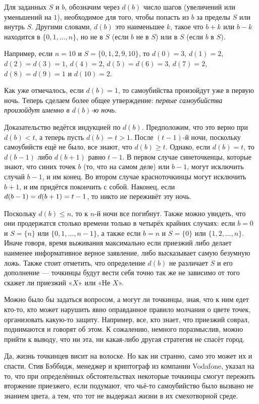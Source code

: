 Для заданных $S$ и $b$, обозначим через $d(b)$ число шагов (увеличений или уменьшений на $1$), необходимое для того, чтобы попасть из $b$ за пределы $S$ или внутрь $S$.
Другими словами, $d(b)$ это наименьшее $k$, такое что $b+k$ или $b-k$ находится в $\{0, 1, \dots, n\}$, но не в $S$ (если $b$ не в  $S$) или в $S$ (если $b$ в $S$).

Например, если $n=10$ и 
$S=\{0,1,2,9,10\}$, то 
$d(0)=3$, 
$d(1)=2$, 
$d(2)=d(3)=1$, 
$d(4)=2$, 
$d(5)=d(6)=3$, 
$d(7)=2$, 
$d(8)=d(9)=1$ и
$d(10)=2$.

Как уже отмечалось, если $d(b)=1$, то самоубийства произойдут уже в первую ночь.
Теперь сделаем более общее утверждение: \emph{первые самоубийства произойдут именно в $d(b)$-ю ночь}.

Доказательство ведётся индукцией по $d(b)$.
Предположим, что это верно при $d(b)<t$, а теперь пусть $d(b)=t>1$.
После $(t-1)$-й ночи, поскольку самоубийств ещё не было, все знают, что $d(b)\ge t$.
Однако, если $d(b)=t$, то $d(b-1)$ либо $d(b+1)$ равно $t-1$.
В первом случае синеточкенцы, которые знают, что синих точек $b$ (то, что на самом деле) или $b-1$, 
могут исключить случай $b-1$, и им конец.
Во втором случае красноточкинцы могут исключить $b+1$, и им придётся покончить с собой.
Наконец, если $d(b-1)\z=d(b+1)=t-1$, то никто не переживёт эту ночь.

Поскольку $d(b) \le n$, то к $n$-й ночи все погибнут.
Также можно увидеть, что они продержатся столько времени только в четырёх крайних случаях:
если $b=0$ и $S=\{n\}$ или $\{0,1,\dots,n-1\}$,
а также если $b=n$ и $S=\{0\}$ или $\{1,2,\dots,n\}$.
Иначе говоря, время выживания максимально если приезжий либо делает наименее информативное верное заявление,
либо высказывает самую безумную ложь.
Также стоит отметить, что определение $d(b)$ не различает 
$S$ и его дополнение --- точкинцы будут вести себя точно так же не зависимо от того скажет ли приезжий «$X$» или «Не $X$».

Можно было бы задаться вопросом, а могут ли точкинцы, зная, что к ним едет кто-то, кто может нарушить явно оправданное правило молчания о цвете точек, организовать какую-то защиту.
Например, все, кто знает, что приезжий соврал, поднимаются и говорят об этом.
К сожалению, немного поразмыслив, можно прийти к выводу, что ни эта, ни какая-либо другая стратегия не спасёт город.

Да, жизнь точкинцев висит на волоске.
Но как ни странно, само это может их и спасти.
Стив Бэббидж, менеджер и криптограф из компании Vodafone, указал на то, что при определённых обстоятельствах некоторые точкинцы смогут пережить вторжение приезжего, если подумают, что чьё-то самоубийство было вызвано не знанием цвета, а тем, что тот не выдержал жизни в их смехотворной среде.


